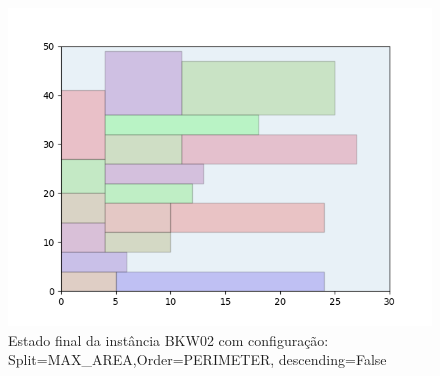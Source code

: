 \begin{figure}[H]
    \centering
    \caption[]{Estado final da instância BKW02 com configuração: Split=MAX_AREA,Order=PERIMETER, descending=False}
    \label{fig:bkw02-max_area-perimeter-false}
    \includegraphics[scale=0.5]{output/figures/bkw/bkw02/max_area/perimeter/false/00}
\end{figure}